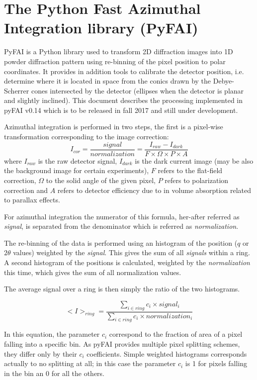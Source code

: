 \documentclass[preprint, pdf]{iucr}              %
\begin{document}
\section{The Python Fast Azimuthal Integration library (PyFAI)}

PyFAI is a Python \cite{python} library used to transform 2D diffraction images into
1D powder diffraction pattern using re-binning of the pixel position to polar coordinates.
It provides in addition tools to calibrate the detector position, i.e. determine
where it is located in space from the conics drawn by the Debye-Scherrer cones
intersected by the detector (ellipses when the detector is planar and slightly
inclined). This document describes the processing implemented in pyFAI
v0.14 which is to be released in fall 2017 and still under development.

Azimuthal integration is performed in two steps, the first is a pixel-wise
transformation corresponding to the image correction:
$$
I_{cor} = \frac{signal}{normalization}  = \frac{I_{raw} - I_{dark}}{F \times
\Omega \times P \times A } $$
where $I_{raw}$ is the raw detector signal, $I_{dark}$ is the dark current
image (may be also the background image for certain experiments), $F$ refers to
the flat-field correction, $\Omega$ to the solid angle of the given pixel, $P$
refers to polarization correction and $A$ refers to detector efficiency due
to in volume absorption related to parallax effects.

For azimuthal integration the numerator of this formula, her-after referred as
\textit{signal}, is separated from the denominator which is referred as
\textit{normalization}.

The re-binning of the data is performed using an histogram of the position ($q$
or $2\theta$ values) weighted by the \textit{signal}.
This gives the sum of all \textit{signals} within a ring.
A second histogram of the positions is calculated, weighted by the
\textit{normalization} this time, which gives the sum of all normalization
values.

The average signal over a ring is then simply the ratio of the two histograms.

$$
<I>_{ring} = \frac{\sum\limits_{i \in ring} c_i \times signal_i}
                  {\sum\limits_{i \in ring} c_i \times normalization_i} 
$$

In this equation, the parameter $c_i$ correspond to the fraction of area of a
pixel falling into a specific bin. 
As pyFAI provides multiple pixel splitting schemes, they differ only by their
$c_i$ coefficients. 
Simple weighted histograms corresponds actually to no splitting at all; in this
case the parameter $c_i$ is 1 for pixels falling in the bin an 0 for all the
others.
  
\end{document}
